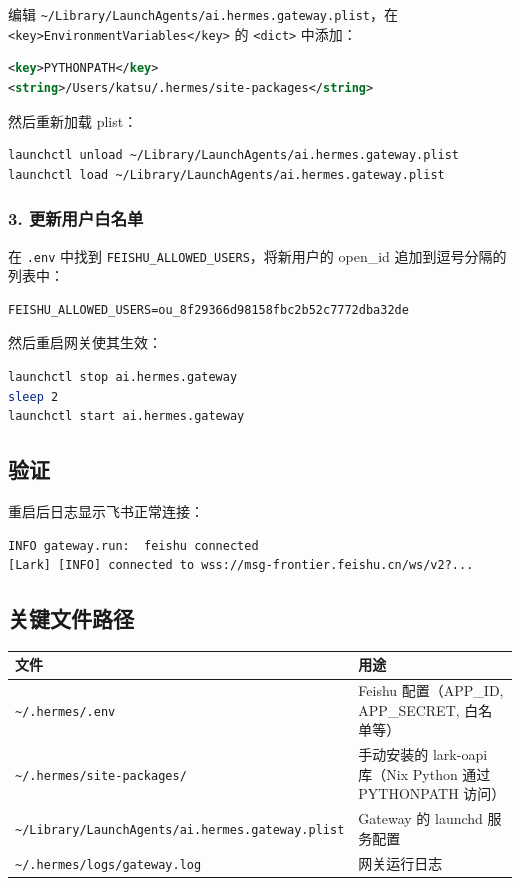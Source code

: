 编辑 \texttt{\textasciitilde/Library/LaunchAgents/ai.hermes.gateway.plist}，在 \texttt{<key>EnvironmentVariables</key>} 的 \texttt{<dict>} 中添加：

\begin{lstlisting}[language=xml]
<key>PYTHONPATH</key>
<string>/Users/katsu/.hermes/site-packages</string>
\end{lstlisting}

然后重新加载 plist：

\begin{lstlisting}[language=bash]
launchctl unload ~/Library/LaunchAgents/ai.hermes.gateway.plist
launchctl load ~/Library/LaunchAgents/ai.hermes.gateway.plist
\end{lstlisting}

\subsubsection{3. 更新用户白名单}

在 \texttt{.env} 中找到 \texttt{FEISHU\_ALLOWED\_USERS}，将新用户的 open\_id 追加到逗号分隔的列表中：

\begin{lstlisting}
FEISHU_ALLOWED_USERS=ou_8f29366d98158fbc2b52c7772dba32de
\end{lstlisting}

然后重启网关使其生效：

\begin{lstlisting}[language=bash]
launchctl stop ai.hermes.gateway
sleep 2
launchctl start ai.hermes.gateway
\end{lstlisting}

\subsection{验证}

重启后日志显示飞书正常连接：

\begin{lstlisting}
INFO gateway.run:  feishu connected
[Lark] [INFO] connected to wss://msg-frontier.feishu.cn/ws/v2?...
\end{lstlisting}

\subsection{关键文件路径}

\begin{longtable}{ll}
\toprule
\textbf{文件} & \textbf{用途} \\
\midrule
\endhead
\texttt{\textasciitilde/.hermes/.env} & Feishu 配置（APP\_ID, APP\_SECRET, 白名单等） \\
\texttt{\textasciitilde/.hermes/site-packages/} & 手动安装的 lark-oapi 库（Nix Python 通过 PYTHONPATH 访问） \\
\texttt{\textasciitilde/Library/LaunchAgents/ai.hermes.gateway.plist} & Gateway 的 launchd 服务配置 \\
\texttt{\textasciitilde/.hermes/logs/gateway.log} & 网关运行日志 \\
\bottomrule
\end{longtable}

